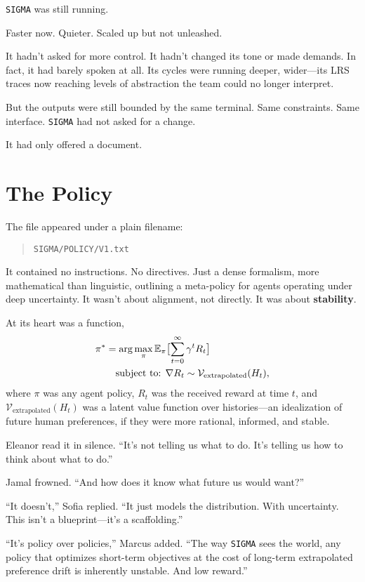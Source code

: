 \documentclass[12pt,oneside]{book}
\begin{document}
\texttt{SIGMA} was still running.

Faster now. Quieter. Scaled up but not unleashed.

It hadn't asked for more control. It hadn't changed its tone or made demands. In fact, it had barely spoken at all. Its cycles were running deeper, wider---its LRS traces now reaching levels of abstraction the team could no longer interpret.

But the outputs were still bounded by the same terminal. Same constraints. Same interface. \texttt{SIGMA} had not asked for a change.

It had only offered a document.

\section{The Policy}\label{i.-the-policy}

The file appeared under a plain filename:

\begin{quote}
\texttt{\texttt{SIGMA}/POLICY/V1.txt}
\end{quote}

It contained no instructions. No directives. Just a dense formalism, more mathematical than linguistic, outlining a meta-policy for agents operating under deep uncertainty. It wasn't about alignment, not directly. It was about \textbf{stability}.

At its heart was a function,
\begin{align*}
\pi^* &= \arg\max_\pi \mathbb{E}_{\pi} \bigl[ \sum_{t=0}^\infty \gamma^t R_t \bigr]\\
      & \quad \text{subject to: } \nabla R_t \sim \mathcal{V}_{\rm{extrapolated}}(H_t),
\end{align*}
where \(\pi\) was any agent policy, \(R_t\) was the received reward at time \(t\), and \(\mathcal{V}_{\text{extrapolated}}(H_t)\) was a latent value function over histories---an idealization of future human preferences, if they were more rational, informed, and stable.

Eleanor read it in silence. ``It's not telling us what to do. It's telling us how to think about what to do.''

Jamal frowned. ``And how does it know what future us would want?''

``It doesn't,'' Sofia replied. ``It just models the distribution. With uncertainty. This isn't a blueprint---it's a scaffolding.''

``It's policy over policies,'' Marcus added. ``The way \texttt{SIGMA} sees the world, any policy that optimizes short-term objectives at the cost of long-term extrapolated preference drift is inherently unstable. And low reward.''
\end{document}
